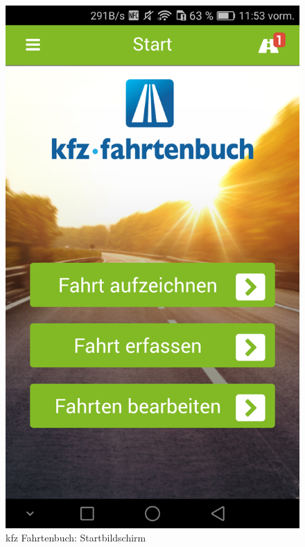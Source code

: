 \documentclass[a4paper]{article}
\begin{document}
\begin{figure}[H]%
    \begin{minipage}[b]{.4\linewidth} %
        \includegraphics[scale=0.14]{img/kfz1}
        \caption{\label{img:img/kfz1}kfz Fahrtenbuch: Startbildschirm}
    \end{minipage}
    \hspace{0.1\linewidth}%
    \begin{minipage}[b]{.4\linewidth} %

\end{minipage}
\end{figure}
\end{document}
